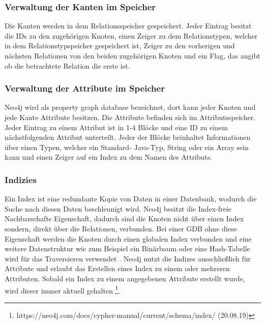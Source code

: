 \subsubsection{Verwaltung der Kanten im Speicher}
Die Kanten werden in dem Relationsspeicher gespeichert. Jeder Eintrag besitzt die IDs zu den zugehörigen Knoten, einen Zeiger zu dem Relationstypen, welcher in dem Relationstypspeicher gespeichert ist, Zeiger zu den vorherigen und nächsten Relationen von den beiden zugehörigen Knoten und ein Flag, das angibt ob die betrachtete Relation die erste ist. \newline
\subsubsection{Verwaltung der Attribute im Speicher}
Neo4j wird als property graph database bezeichnet, dort kann jeder Knoten und jede Kante Attribute besitzen. Die Attribute befinden sich im Attributsspeicher. Jeder Eintrag zu einem Attribut ist in 1-4 Blöcke und eine ID zu einem nächstfolgenden Attribut unterteilt. Jeder der Blöcke beinhaltet Informationen über einen Typen, welcher ein Standard- Java-Typ, String oder ein Array sein kann und einen Zeiger auf ein Index zu dem Namen des Attributs.  \newline
\subsubsection{Indizies}
Ein Index ist eine redundante Kopie von Daten in einer Datenbank, wodurch die Suche nach diesen Daten beschleunigt wird. Neo4j besitzt die Index-freie Nachbarschafts Eigenschaft, dadurch sind die Knoten nicht über einen Index  sondern, direkt über die Relationen, verbunden. Bei einer GDB ohne diese Eigenschaft werden die Knoten durch einen globalen Index verbunden und eine weitere Datenstruktur wie zum Beispiel ein Binärbaum oder eine Hash-Tabelle wird für das Traversieren verwendet \parencite{robinson2013graph}. \newline
Neo4j nutzt die Indizes ausschließlich für Attribute und erlaubt das Erstellen eines Index zu einem oder mehreren Attributen. Sobald ein Index zu einem angegebenen Attribute erstellt wurde, wird dieser immer aktuell gehalten \footnote{https://neo4j.com/docs/cypher-manual/current/schema/index/ (20.08.19)}.  	
